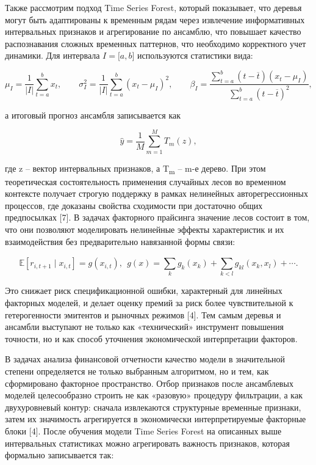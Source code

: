 \documentclass[
]{article}
\begin{document}
Также рассмотрим подход Time Series Forest, который показывает, что деревья могут быть адаптированы к временным рядам через извлечение информативных интервальных признаков и агрегирование по ансамблю, что повышает качество распознавания сложных временных паттернов, что необходимо корректного учет динамики. Для интервала \(I = \lbrack a,b\rbrack\) используются статистики вида:

\[\mu_{I} = \frac{1}{|I|}\sum_{t = a}^{b}x_{t},\quad\quad\sigma_{I}^{2} = \frac{1}{|I|}\sum_{t = a}^{b}\left( x_{t} - \mu_{I} \right)^{2},\quad\quad\beta_{I} = \frac{\sum_{t = a}^{b}{\left( t - \overline{t} \right)\left( x_{t} - \mu_{I} \right)}}{\sum_{t = a}^{b}\left( t - \overline{t} \right)^{2}},\]

а итоговый прогноз ансамбля записывается как

\[\widehat{y} = \frac{1}{M}\sum_{m = 1}^{M}{T_{m}(z)},\]

где z -- вектор интервальных признаков, а T\textsubscript{m} -- m-е дерево. При этом теоретическая состоятельность применения случайных лесов во временном контексте получает строгую поддержку в рамках нелинейных авторегрессионных процессов, где доказаны свойства сходимости при достаточно общих предпосылках {[}7{]}. В задачах факторного прайсинга значение лесов состоит в том, что они позволяют моделировать нелинейные эффекты характеристик и их взаимодействия без предварительно навязанной формы связи:

\[\mathbb{E}\left\lbrack r_{i,t + 1}\mid x_{i,t} \right\rbrack = g\left( x_{i,t} \right),\ \ g(x) = \sum_{k}^{}{g_{k}\left( x_{k} \right)} + \sum_{k < l}^{}{g_{kl}\left( x_{k},x_{l} \right)} + \cdots.\]

Это снижает риск спецификационной ошибки, характерный для линейных факторных моделей, и делает оценку премий за риск более чувствительной к гетерогенности эмитентов и рыночных режимов {[}4{]}. Тем самым деревья и ансамбли выступают не только как «технический» инструмент повышения точности, но и как способ уточнения экономической интерпретации факторов.

В задачах анализа финансовой отчетности качество модели в значительной степени определяется не только выбранным алгоритмом, но и тем, как сформировано факторное пространство. Отбор признаков после ансамблевых моделей целесообразно строить не как «разовую» процедуру фильтрации, а как двухуровневый контур: сначала извлекаются структурные временные признаки, затем их значимость агрегируется в экономически интерпретируемые факторные блоки {[}4{]}. После обучения модели Time Series Forest на описанных выше интервальных статистиках можно агрегировать важность признаков, которая формально записывается так:
\end{document}
